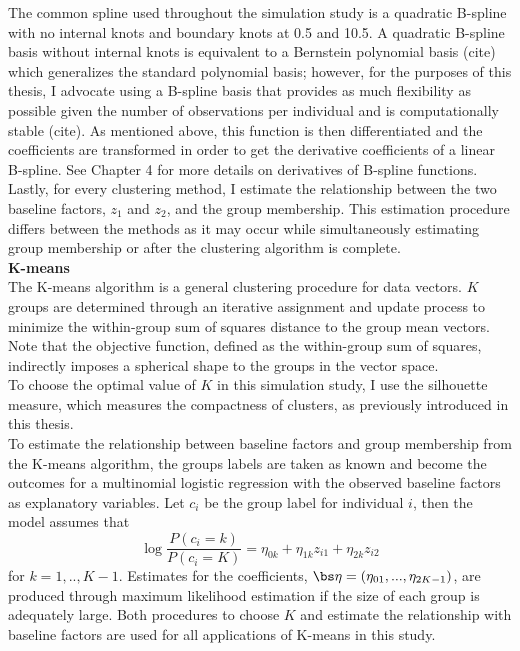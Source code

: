 The common spline used throughout the simulation study is a quadratic B-spline with no internal knots and boundary knots at 0.5 and 10.5. A quadratic B-spline basis without internal knots is equivalent to a Bernstein polynomial basis (cite) which generalizes the standard polynomial basis; however, for the purposes of this thesis, I advocate using a B-spline basis that provides as much flexibility as possible given the number of observations per individual and is computationally stable (cite).  As mentioned above, this function is then differentiated and the coefficients are transformed in order to get the derivative coefficients of a linear B-spline. See Chapter 4 for more details on derivatives of B-spline functions.\\

Lastly, for every clustering method, I estimate the relationship between the two baseline factors, $z_{1}$ and $z_{2}$, and the group membership. This estimation procedure differs between the methods as it may occur while simultaneously estimating group membership or after the clustering algorithm is complete. \\

\noindent \textbf{K-means}\\
The K-means algorithm is a general clustering procedure for data vectors. $K$ groups are determined through an iterative assignment and update process to minimize the within-group sum of squares distance to the group mean vectors. Note that the objective function, defined as the within-group sum of squares, indirectly imposes a spherical shape to the groups in the vector space.\\

To choose the optimal value of $K$ in this simulation study, I use the silhouette measure, which measures the compactness of clusters, as previously introduced in this thesis. \\

To estimate the relationship between baseline factors and group membership from the K-means algorithm, the groups labels are taken as known and become the outcomes for a multinomial logistic regression with the observed baseline factors as explanatory variables. Let $c_{i}$ be the group label for individual $i$, then the model assumes that
$$\log\frac{P(c_{i}=k)}{P(c_{i}=K)} = \eta_{0k}+\eta_{1k}z_{i1}+\eta_{2k}z_{i2}$$
for $k=1,..,K-1$. Estimates for the coefficients, $\bs\eta = (\eta_{01},...,\eta_{2K-1})$, are produced through maximum likelihood estimation if the size of each group is adequately large. Both procedures to choose $K$ and estimate the relationship with baseline factors are used for all applications of K-means in this study.\\

